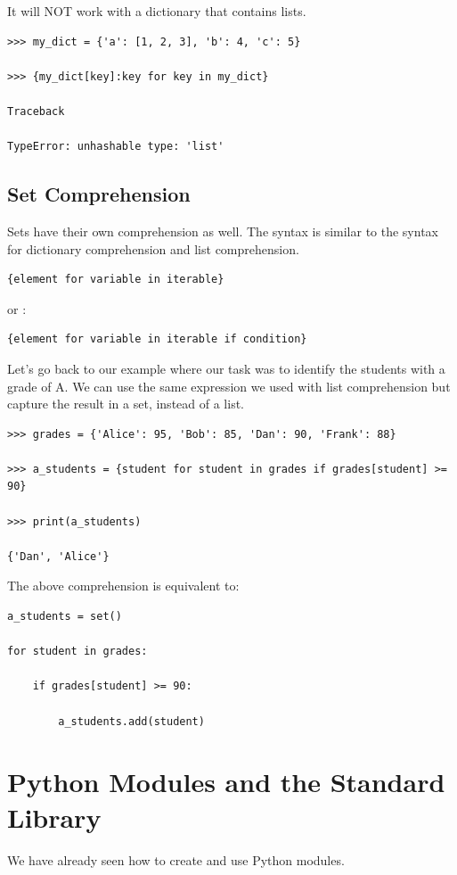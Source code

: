 \documentclass{article}
\begin{document}
It will NOT work with a dictionary that contains lists. 

\begin{lstlisting}
>>> my_dict = {'a': [1, 2, 3], 'b': 4, 'c': 5} 

>>> {my_dict[key]:key for key in my_dict}

Traceback 

TypeError: unhashable type: 'list'
\end{lstlisting}

\subsection{Set Comprehension}
Sets have their own comprehension as well. The syntax is similar to the syntax for dictionary comprehension and list comprehension. 

\begin{lstlisting}
{element for variable in iterable}
\end{lstlisting}

or :

\begin{lstlisting}
{element for variable in iterable if condition}
\end{lstlisting}

Let’s go back to our example where our task was to identify the students with a grade of A.  We can use the same expression we used with list comprehension but capture the result in a set, instead of a list.

\begin{lstlisting} 
>>> grades = {'Alice': 95, 'Bob': 85, 'Dan': 90, 'Frank': 88}

>>> a_students = {student for student in grades if grades[student] >= 90}

>>> print(a_students)

{'Dan', 'Alice'}
\end{lstlisting}

The above comprehension is equivalent to:

\begin{lstlisting}
a_students = set()

for student in grades:

    if grades[student] >= 90:

        a_students.add(student)
\end{lstlisting}

\section{Python Modules and the Standard Library}
We have already seen how to create and use Python modules.
\end{document}
